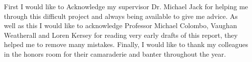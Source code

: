 First I would like to Acknowledge my supervisor Dr. Michael Jack for helping me through this difficult project and always being available to give me advice. As well as this I would like to acknowledge Professor Michael Colombo, Vaughan Weatherall and Loren Kersey for reading very early drafts of this report, they helped me to remove many mistakes. Finally, I would like to thank my colleagues in the honors room for their camaraderie and banter throughout the year.